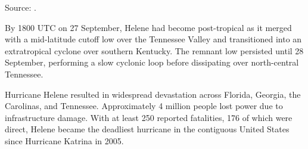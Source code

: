\begin{table}[]
	\centering
	\caption{Highest Rainfall Totals by State}
	\label{tab:highest_rainfall_state}
	
	\vspace{2mm}
	{\centering Source: \cite{nhc_helene20241}.\par}
\end{table}

By 1800 UTC on 27 September, Helene had become post-tropical as it merged with a mid-latitude cutoff low over the Tennessee Valley and transitioned into an extratropical cyclone over southern Kentucky. The remnant low persisted until 28 September, performing a slow cyclonic loop before dissipating over north-central Tennessee.

Hurricane Helene resulted in widespread devastation across Florida, Georgia, the Carolinas, and Tennessee. Approximately 4 million people lost power due to infrastructure damage. With at least 250 reported fatalities, 176 of which were direct, Helene became the deadliest hurricane in the contiguous United States since Hurricane Katrina in 2005.

